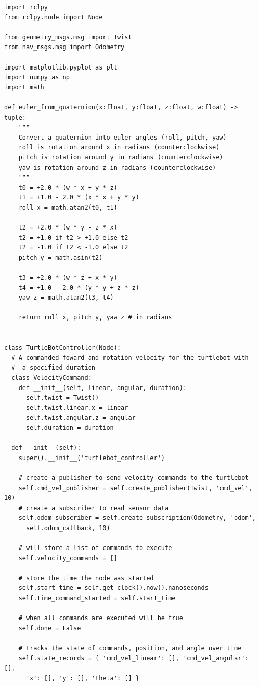 \documentclass{article}
\begin{document}
\begin{verbatim}
import rclpy
from rclpy.node import Node

from geometry_msgs.msg import Twist
from nav_msgs.msg import Odometry

import matplotlib.pyplot as plt
import numpy as np
import math

def euler_from_quaternion(x:float, y:float, z:float, w:float) -> tuple:
    """
    Convert a quaternion into euler angles (roll, pitch, yaw)
    roll is rotation around x in radians (counterclockwise)
    pitch is rotation around y in radians (counterclockwise)
    yaw is rotation around z in radians (counterclockwise)
    """
    t0 = +2.0 * (w * x + y * z)
    t1 = +1.0 - 2.0 * (x * x + y * y)
    roll_x = math.atan2(t0, t1)
   
    t2 = +2.0 * (w * y - z * x)
    t2 = +1.0 if t2 > +1.0 else t2
    t2 = -1.0 if t2 < -1.0 else t2
    pitch_y = math.asin(t2)
   
    t3 = +2.0 * (w * z + x * y)
    t4 = +1.0 - 2.0 * (y * y + z * z)
    yaw_z = math.atan2(t3, t4)
   
    return roll_x, pitch_y, yaw_z # in radians


class TurtleBotController(Node):
  # A commanded foward and rotation velocity for the turtlebot with
  #  a specified duration
  class VelocityCommand:
    def __init__(self, linear, angular, duration):
      self.twist = Twist()
      self.twist.linear.x = linear
      self.twist.angular.z = angular
      self.duration = duration

  def __init__(self):
    super().__init__('turtlebot_controller')

    # create a publisher to send velocity commands to the turtlebot
    self.cmd_vel_publisher = self.create_publisher(Twist, 'cmd_vel', 10)
    # create a subscriber to read sensor data
    self.odom_subscriber = self.create_subscription(Odometry, 'odom', 
      self.odom_callback, 10)

    # will store a list of commands to execute
    self.velocity_commands = []

    # store the time the node was started
    self.start_time = self.get_clock().now().nanoseconds
    self.time_command_started = self.start_time

    # when all commands are executed will be true
    self.done = False

    # tracks the state of commands, position, and angle over time
    self.state_records = { 'cmd_vel_linear': [], 'cmd_vel_angular': [], 
      'x': [], 'y': [], 'theta': [] }



\end{verbatim}
\end{document}

